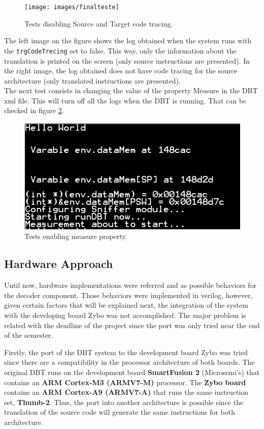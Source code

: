 \documentclass[12pt]{article}
\begin{document}
{\begin{figure}[H]
\centerline{
\texttt{[image: images/finalteste]}
}
\caption{Tests disabling Source and Target code tracing.}
\label{fig:finalteste}
\end{figure}


The left image on the figure shows the log obtained when the system runs with the \texttt{trgCodeTrecing} set to false. This way, only the information about the translation is printed on the screen (only source instructions are presented). In the right image, the log obtained does not have code tracing for the source architecture (only translated instructions are presented). \\

The next test consists in changing the value of the property Measure in the DBT xml file. This will turn off all the logs when the DBT is running. That can be checked in figure \ref{fig:val4}.

\begin{figure}[H]
\centerline{
\includegraphics[scale=0.6]{images/val4}
}
\caption{Tests enabling measure property.}
\label{fig:val4}
\end{figure}


\newpage
\subsection{Hardware Approach}

Until now, hardware implementations were referred and as possible behaviors for the decoder component. Those behaviors were implemented in verilog, however, given certain factors that will be explained next, the integration of the system with the developing board Zybo was not accomplished. The major problem is related with the deadline of the project since the port was only tried near the end of the semester.

Firstly, the port of the DBT system to the development board Zybo was tried since there are a compatibility in the processor architecture of both boards. The original DBT runs on the development board \textbf{SmartFusion 2} (Microsemi's) that contains an \textbf{ARM Cortex-M3 (ARMV7-M)} processor. The \textbf{Zybo board} contains an \textbf{ARM Cortex-A9 (ARMV7-A)} that runs the same instruction set, \textbf{Thumb-2}. Thus, the port into another architecture is possible since the translation of the source code will generate the same instructions for both architecture. 

}
\end{document}
